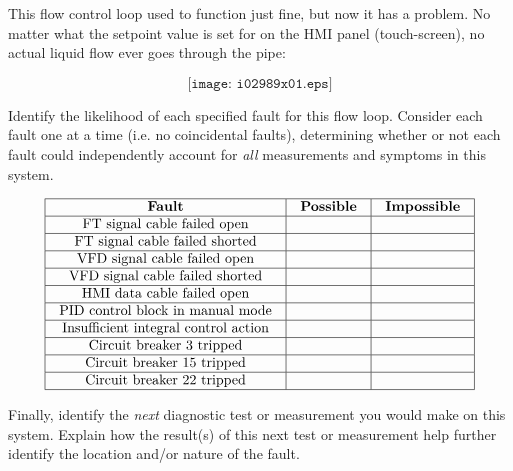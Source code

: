 

This flow control loop used to function just fine, but now it has a problem.  No matter what the setpoint value is set for on the HMI panel (touch-screen), no actual liquid flow ever goes through the pipe:

$$\texttt{[image: i02989x01.eps]}$$

Identify the likelihood of each specified fault for this flow loop.  Consider each fault one at a time (i.e. no coincidental faults), determining whether or not each fault could independently account for {\it all} measurements and symptoms in this system.


$$\vbox{\offinterlineskip
\halign{\strut
\vrule \quad\hfil # \ \hfil & 
\vrule \quad\hfil # \ \hfil & 
\vrule \quad\hfil # \ \hfil \vrule \cr
\noalign{\hrule}
%
{\bf Fault} & {\bf Possible} & {\bf Impossible} \cr
%
\noalign{\hrule}
%
FT signal cable failed open &  &  \cr
%
\noalign{\hrule}
%
FT signal cable failed shorted &  &  \cr
%
\noalign{\hrule}
%
VFD signal cable failed open &  &  \cr
%
\noalign{\hrule}
%
VFD signal cable failed shorted &  &  \cr
%
\noalign{\hrule}
%
HMI data cable failed open &  &  \cr
%
\noalign{\hrule}
%
PID control block in manual mode &  &  \cr
%
\noalign{\hrule}
%
Insufficient integral control action &  &  \cr
%
\noalign{\hrule}
%
Circuit breaker 3 tripped &  &  \cr
%
\noalign{\hrule}
%
Circuit breaker 15 tripped &  &  \cr
%
\noalign{\hrule}
%
Circuit breaker 22 tripped &  &  \cr
%
\noalign{\hrule}
} %
}$$ %

Finally, identify the {\it next} diagnostic test or measurement you would make on this system.  Explain how the result(s) of this next test or measurement help further identify the location and/or nature of the fault.







